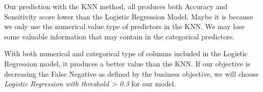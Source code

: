 \documentclass[
]{article}
\begin{document}
Our prediction with the KNN method, all produces both Accuracy and
Sensitivity score lower than the Logistic Regression Model. Maybe it is
because we only use the numerical value type of predictors in the KNN.
We may lose some valuable information that may contain in the
categorical predictors.

With both numerical and categorical type of columns included in the
Logistic Regression model, it produces a better value than the KNN. If
our objective is decreasing the False Negative as defined by the
business objective, we will choose \emph{Logistic Regression with
threshold \textgreater{} 0.3} for our model.
\end{document}
